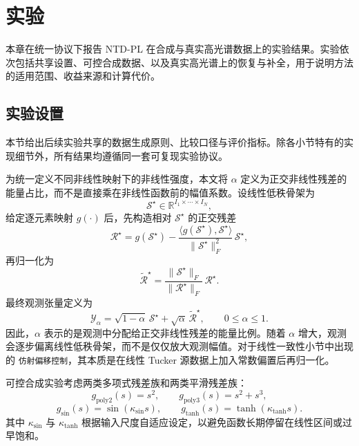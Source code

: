 \section{实验}

本章在统一协议下报告 NTD-PL 在合成与真实高光谱数据上的实验结果。实验依次包括共享设置、可控合成数据、以及真实高光谱上的恢复与补全，用于说明方法的适用范围、收益来源和计算代价。

\subsection{实验设置}
\label{sec:exp-setup}

本节给出后续实验共享的数据生成原则、比较口径与评价指标。除各小节特有的实现细节外，所有结果均遵循同一套可复现实验协议。

为统一定义不同非线性映射下的非线性强度，本文将 $\alpha$ 定义为正交非线性残差的能量占比，而不是直接乘在非线性函数前的幅值系数。设线性低秩骨架为
\begin{equation}
\mathcal S^\star \in \mathbb R^{I_1\times \cdots \times I_N},
\end{equation}
给定逐元素映射 $g(\cdot)$ 后，先构造相对 $\mathcal S^\star$ 的正交残差
\begin{equation}
\mathcal R^\star
=
g(\mathcal S^\star)
-
\frac{\langle g(\mathcal S^\star), \mathcal S^\star\rangle}{\|\mathcal S^\star\|_F^2}\,\mathcal S^\star,
\end{equation}
再归一化为
\begin{equation}
\widetilde{\mathcal R}^\star
=
\frac{\|\mathcal S^\star\|_F}{\|\mathcal R^\star\|_F}\,\mathcal R^\star.
\end{equation}
最终观测张量定义为
\begin{equation}
\mathcal Y_\alpha
=
\sqrt{1-\alpha}\,\mathcal S^\star
+
\sqrt{\alpha}\,\widetilde{\mathcal R}^\star,
\qquad 0\le \alpha\le 1.
\label{eq:exp-alpha-energy}
\end{equation}
因此，$\alpha$ 表示的是观测中分配给正交非线性残差的能量比例。随着 $\alpha$ 增大，观测会逐步偏离线性低秩骨架，而不是仅仅放大观测幅值。对于线性一致性小节中出现的 \texttt{仿射偏移控制}，其本质是在线性 Tucker 源数据上加入常数偏置后再归一化。

可控合成实验考虑两类多项式残差族和两类平滑残差族：
\begin{equation}
g_{\mathrm{poly2}}(s)=s^2,\qquad
g_{\mathrm{poly3}}(s)=s^2+s^3,
\end{equation}
\begin{equation}
g_{\sin}(s)=\sin(\kappa_{\sin}s),\qquad
g_{\tanh}(s)=\tanh(\kappa_{\tanh}s).
\end{equation}
其中 $\kappa_{\sin}$ 与 $\kappa_{\tanh}$ 根据输入尺度自适应设定，以避免函数长期停留在线性区间或过早饱和。

